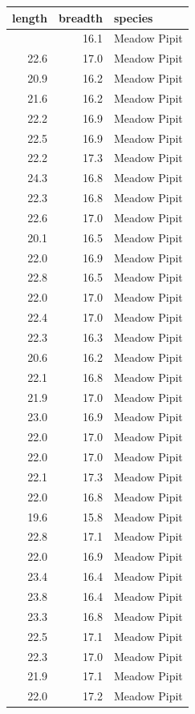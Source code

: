 \documentclass[
  letterpaper,
  DIV=11,
  numbers=noendperiod]{scrartcl}
\newcounter{none} %
\begin{document}
{\def\LTcaptype{none} %
\begin{longtable}[]{@{}rrl@{}}
\toprule\noalign{}
length & breadth & species \\
\midrule\noalign{}
\endhead
\bottomrule\noalign{}
\endlastfoot
21.7 & 16.1 & Meadow Pipit \\
22.6 & 17.0 & Meadow Pipit \\
20.9 & 16.2 & Meadow Pipit \\
21.6 & 16.2 & Meadow Pipit \\
22.2 & 16.9 & Meadow Pipit \\
22.5 & 16.9 & Meadow Pipit \\
22.2 & 17.3 & Meadow Pipit \\
24.3 & 16.8 & Meadow Pipit \\
22.3 & 16.8 & Meadow Pipit \\
22.6 & 17.0 & Meadow Pipit \\
20.1 & 16.5 & Meadow Pipit \\
22.0 & 16.9 & Meadow Pipit \\
22.8 & 16.5 & Meadow Pipit \\
22.0 & 17.0 & Meadow Pipit \\
22.4 & 17.0 & Meadow Pipit \\
22.3 & 16.3 & Meadow Pipit \\
20.6 & 16.2 & Meadow Pipit \\
22.1 & 16.8 & Meadow Pipit \\
21.9 & 17.0 & Meadow Pipit \\
23.0 & 16.9 & Meadow Pipit \\
22.0 & 17.0 & Meadow Pipit \\
22.0 & 17.0 & Meadow Pipit \\
22.1 & 17.3 & Meadow Pipit \\
22.0 & 16.8 & Meadow Pipit \\
19.6 & 15.8 & Meadow Pipit \\
22.8 & 17.1 & Meadow Pipit \\
22.0 & 16.9 & Meadow Pipit \\
23.4 & 16.4 & Meadow Pipit \\
23.8 & 16.4 & Meadow Pipit \\
23.3 & 16.8 & Meadow Pipit \\
22.5 & 17.1 & Meadow Pipit \\
22.3 & 17.0 & Meadow Pipit \\
21.9 & 17.1 & Meadow Pipit \\
22.0 & 17.2 & Meadow Pipit \\

\end{longtable}}
\end{document}

